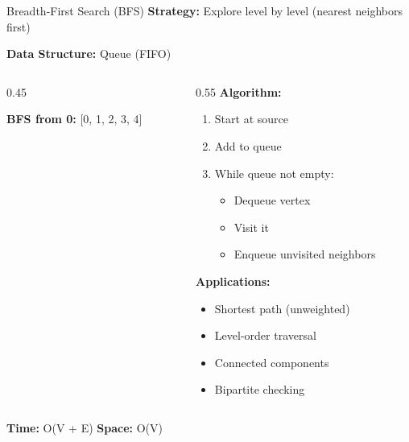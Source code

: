 \documentclass[aspectratio=169]{beamer}
\begin{document}
\begin{frame}{Breadth-First Search (BFS)}
  \textbf{Strategy:} Explore level by level (nearest neighbors first)

  \vspace{0.3cm}
  \textbf{Data Structure:} Queue (FIFO)

  \vspace{0.3cm}
  \begin{columns}[T]
    \begin{column}{0.45\textwidth}
      \begin{center}
      \end{center}

      \textbf{BFS from 0:} [0, 1, 2, 3, 4]
    \end{column}

    \begin{column}{0.55\textwidth}
      \textbf{Algorithm:}
      \begin{enumerate}
        \item Start at source
        \item Add to queue
        \item While queue not empty:
          \begin{itemize}
            \item Dequeue vertex
            \item Visit it
            \item Enqueue unvisited neighbors
          \end{itemize}
      \end{enumerate}

      \vspace{0.3cm}
      \textbf{Applications:}
      \begin{itemize}
        \item Shortest path (unweighted)
        \item Level-order traversal
        \item Connected components
        \item Bipartite checking
      \end{itemize}
    \end{column}
  \end{columns}

  \vspace{0.3cm}
  \textbf{Time:} O(V + E) \quad \textbf{Space:} O(V)
\end{frame}
\end{document}
